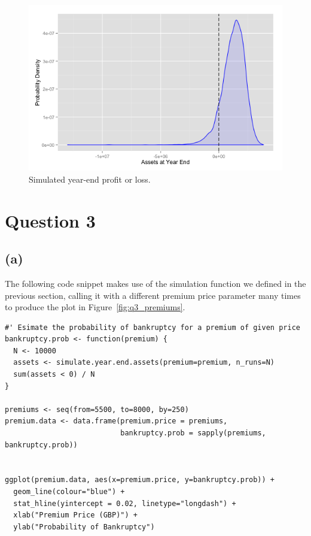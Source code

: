 \documentclass{article}
\begin{document}
\begin{figure}
  \includegraphics[width=\textwidth]{q2_histogram}
  \caption{Simulated year-end profit or loss.}
  \centering
\label{fig:q2_histogram}
\end{figure}

\section*{Question 3}

\subsection*{(a)}

The following code snippet makes use of the simulation function we
defined in the previous section, calling it with a different premium
price parameter many times to produce the plot in Figure~\ref{fig:q3_premiums}.

\begin{verbatim}
#' Esimate the probability of bankruptcy for a premium of given price
bankruptcy.prob <- function(premium) {
  N <- 10000
  assets <- simulate.year.end.assets(premium=premium, n_runs=N)
  sum(assets < 0) / N
}

premiums <- seq(from=5500, to=8000, by=250)
premium.data <- data.frame(premium.price = premiums,
                           bankruptcy.prob = sapply(premiums, bankruptcy.prob))


ggplot(premium.data, aes(x=premium.price, y=bankruptcy.prob)) +
  geom_line(colour="blue") +
  stat_hline(yintercept = 0.02, linetype="longdash") +
  xlab("Premium Price (GBP)") +
  ylab("Probability of Bankruptcy")
\end{verbatim}
\end{document}
